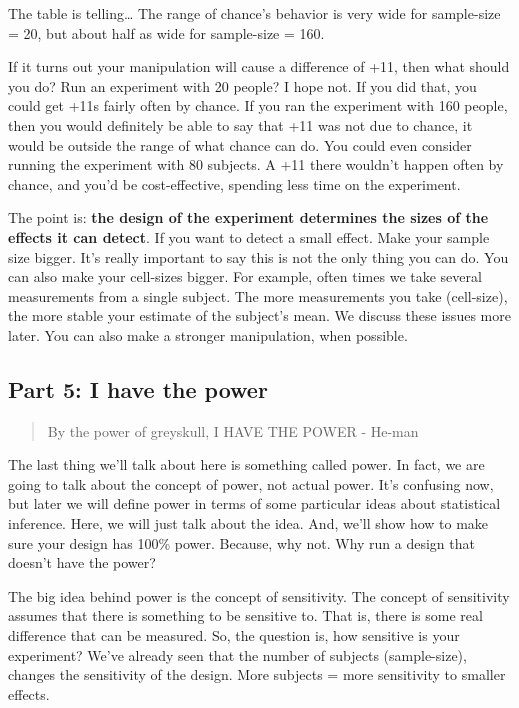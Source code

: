\documentclass[
]{book}
\begin{document}
The table is telling\ldots{} The range of chance's behavior is very wide for sample-size = 20, but about half as wide for sample-size = 160.

If it turns out your manipulation will cause a difference of +11, then what should you do? Run an experiment with 20 people? I hope not. If you did that, you could get +11s fairly often by chance. If you ran the experiment with 160 people, then you would definitely be able to say that +11 was not due to chance, it would be outside the range of what chance can do. You could even consider running the experiment with 80 subjects. A +11 there wouldn't happen often by chance, and you'd be cost-effective, spending less time on the experiment.

The point is: \textbf{the design of the experiment determines the sizes of the effects it can detect}. If you want to detect a small effect. Make your sample size bigger. It's really important to say this is not the only thing you can do. You can also make your cell-sizes bigger. For example, often times we take several measurements from a single subject. The more measurements you take (cell-size), the more stable your estimate of the subject's mean. We discuss these issues more later. You can also make a stronger manipulation, when possible.

\subsection{Part 5: I have the power}\label{part-5-i-have-the-power}

\begin{quote}
By the power of greyskull, I HAVE THE POWER - He-man
\end{quote}

The last thing we'll talk about here is something called power. In fact, we are going to talk about the concept of power, not actual power. It's confusing now, but later we will define power in terms of some particular ideas about statistical inference. Here, we will just talk about the idea. And, we'll show how to make sure your design has 100\% power. Because, why not. Why run a design that doesn't have the power?

The big idea behind power is the concept of sensitivity. The concept of sensitivity assumes that there is something to be sensitive to. That is, there is some real difference that can be measured. So, the question is, how sensitive is your experiment? We've already seen that the number of subjects (sample-size), changes the sensitivity of the design. More subjects = more sensitivity to smaller effects.
\end{document}
